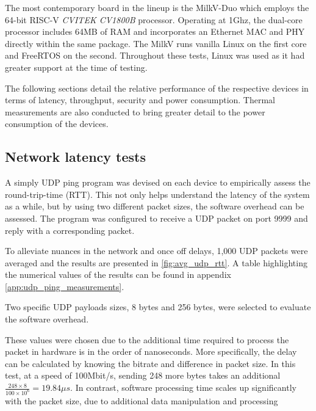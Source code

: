 The most contemporary board in the lineup is the MilkV-Duo which employs the 64-bit RISC-V \textit{CVITEK CV1800B} processor. Operating at 1Ghz, the dual-core processor includes 64MB of RAM and incorporates an Ethernet MAC and PHY directly within the same package. The MilkV runs vanilla Linux on the first core and FreeRTOS on the second. Throughout these tests, Linux was used as it had greater support at the time of testing. 

The following sections detail the relative performance of the respective devices in terms of latency, throughput, security and power consumption. Thermal measurements are also conducted to bring greater detail to the power consumption of the devices.


\newpage

\subsection{Network latency tests}


A simply UDP ping program was devised on each device to empirically assess the round-trip-time (RTT). This not only helps understand the latency of the system as a while, but by using two different packet sizes, the software overhead can be assessed. The program was configured to receive a UDP packet on port 9999 and reply with a corresponding packet. 

To alleviate nuances in the network and once off delays, 1,000 UDP packets were averaged and the results are presented in \ref{fig:avg_udp_rtt}. A table highlighting the numerical values of the results can be found in appendix \ref{app:udp_ping_measurements}.

Two specific UDP payloads sizes, 8 bytes and 256 bytes, were selected to evaluate the software overhead. 

These values were chosen due to the additional time required to process the packet in hardware is in the order of nanoseconds. More specifically, the delay can be calculated by knowing the bitrate and difference in packet size. In this test, at a speed of 100Mbit/s, sending 248 more bytes takes an additional $\frac{248 \times 8}{100 \times 10^6}=19.84\mu s$. In contrast, software processing time scales up significantly with the packet size, due to additional data manipulation and processing

